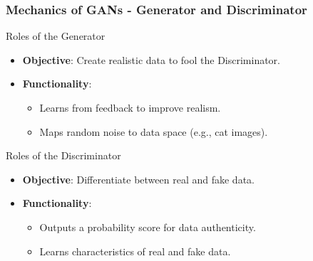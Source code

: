 \documentclass[aspectratio=169]{beamer}
\begin{document}
\begin{frame}[fragile]
    \frametitle{Mechanics of GANs - Generator and Discriminator}
    \begin{block}{Roles of the Generator}
        \begin{itemize}
            \item \textbf{Objective}: Create realistic data to fool the Discriminator.
            \item \textbf{Functionality}:
            \begin{itemize}
                \item Learns from feedback to improve realism.
                \item Maps random noise to data space (e.g., cat images).
            \end{itemize}
        \end{itemize}
    \end{block}
    
    \begin{block}{Roles of the Discriminator}
        \begin{itemize}
            \item \textbf{Objective}: Differentiate between real and fake data.
            \item \textbf{Functionality}:
            \begin{itemize}
                \item Outputs a probability score for data authenticity.
                \item Learns characteristics of real and fake data.
            \end{itemize}
        \end{itemize}
    \end{block}
\end{frame}
\end{document}
